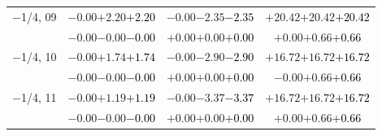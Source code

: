 \documentclass[compress]{beamer}
\begin{document}
\begin{frame}
\begin{tabular}{r | c | c | c}
$-$1/4, 09 & $-0.00$\hspace{0.1 cm}$+2.20$\hspace{0.1 cm}\textcolor{black}{$+2.20$} & $-0.00$\hspace{0.1 cm}$-2.35$\hspace{0.1 cm}\textcolor{black}{$-2.35$} & $+20.42$\hspace{0.1 cm}$+20.42$\hspace{0.1 cm}\textcolor{black}{$+20.42$} \\
           & $-0.00$\hspace{0.1 cm}$-0.00$\hspace{0.1 cm}\textcolor{black}{$-0.00$} & $+0.00$\hspace{0.1 cm}$+0.00$\hspace{0.1 cm}\textcolor{black}{$+0.00$} & $+0.00$\hspace{0.1 cm}$+0.66$\hspace{0.1 cm}\textcolor{black}{$+0.66$} \\
$-$1/4, 10 & $-0.00$\hspace{0.1 cm}$+1.74$\hspace{0.1 cm}\textcolor{black}{$+1.74$} & $-0.00$\hspace{0.1 cm}$-2.90$\hspace{0.1 cm}\textcolor{black}{$-2.90$} & $+16.72$\hspace{0.1 cm}$+16.72$\hspace{0.1 cm}\textcolor{black}{$+16.72$} \\
           & $-0.00$\hspace{0.1 cm}$-0.00$\hspace{0.1 cm}\textcolor{black}{$-0.00$} & $+0.00$\hspace{0.1 cm}$+0.00$\hspace{0.1 cm}\textcolor{black}{$+0.00$} & $-0.00$\hspace{0.1 cm}$+0.66$\hspace{0.1 cm}\textcolor{black}{$+0.66$} \\
$-$1/4, 11 & $-0.00$\hspace{0.1 cm}$+1.19$\hspace{0.1 cm}\textcolor{black}{$+1.19$} & $-0.00$\hspace{0.1 cm}$-3.37$\hspace{0.1 cm}\textcolor{black}{$-3.37$} & $+16.72$\hspace{0.1 cm}$+16.72$\hspace{0.1 cm}\textcolor{black}{$+16.72$} \\
           & $-0.00$\hspace{0.1 cm}$-0.00$\hspace{0.1 cm}\textcolor{black}{$-0.00$} & $+0.00$\hspace{0.1 cm}$+0.00$\hspace{0.1 cm}\textcolor{black}{$+0.00$} & $+0.00$\hspace{0.1 cm}$+0.66$\hspace{0.1 cm}\textcolor{black}{$+0.66$} \\

\end{tabular}
\end{frame}
\end{document}
